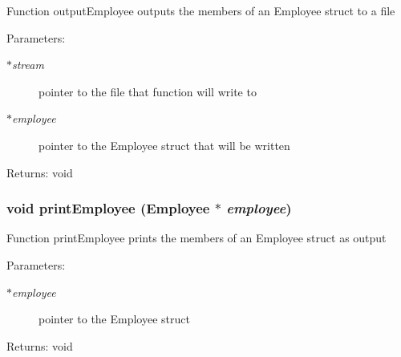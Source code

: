 Function output\-Employee outputs the members of an Employee struct to a file \begin{Desc}
\item[Parameters:]
\begin{description}
\item[{\em $\ast$stream}]pointer to the file that function will write to \item[{\em $\ast$employee}]pointer to the Employee struct that will be written \end{description}
\end{Desc}
\begin{Desc}
\item[Returns:]void \end{Desc}
\subsubsection{\setlength{\rightskip}{0pt plus 5cm}void print\-Employee (\bf{Employee} $\ast$ {\em employee})}\label{mystructs_8c_291560c311b426d2ea7f359bfc45ed5f}


Function print\-Employee prints the members of an Employee struct as output \begin{Desc}
\item[Parameters:]
\begin{description}
\item[{\em $\ast$employee}]pointer to the Employee struct \end{description}
\end{Desc}
\begin{Desc}
\item[Returns:]void \end{Desc}
